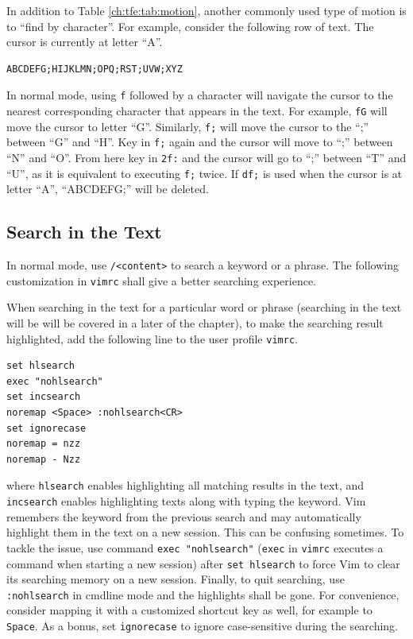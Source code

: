 In addition to Table \ref{ch:tfe:tab:motion}, another commonly used type of motion is to ``find by character''. For example, consider the following row of text. The cursor is currently at letter ``A''.
\begin{lstlisting}
ABCDEFG;HIJKLMN;OPQ;RST;UVW;XYZ
\end{lstlisting}
In normal mode, using \verb|f| followed by a character will navigate the cursor to the nearest corresponding character that appears in the text. For example, \verb|fG| will move the cursor to letter ``G''. Similarly, \verb|f;| will move the cursor to the ``;'' between ``G'' and ``H''. Key in \verb|f;| again and the cursor will move to ``;'' between ``N'' and ``O''. From here key in \verb|2f:| and the cursor will go to ``;'' between ``T'' and ``U'', as it is equivalent to executing \verb|f;| twice. If \verb|df;| is used when the cursor is at letter ``A'', ``ABCDEFG;'' will be deleted.

\subsection{Search in the Text}

In normal mode, use \verb|/<content>| to search a keyword or a phrase. The following customization in \verb|vimrc| shall give a better searching experience.

When searching in the text for a particular word or phrase (searching in the text will be will be covered in a later of the chapter), to make the searching result highlighted, add the following line to the user profile \verb|vimrc|.
\begin{lstlisting}
set hlsearch
exec "nohlsearch"
set incsearch
noremap <Space> :nohlsearch<CR>
set ignorecase
noremap = nzz
noremap - Nzz
\end{lstlisting}
where \verb|hlsearch| enables highlighting all matching results in the text, and \verb|incsearch| enables highlighting texts along with typing the keyword. Vim remembers the keyword from the previous search and may automatically highlight them in the text on a new session. This can be confusing sometimes. To tackle the issue, use command \verb|exec "nohlsearch"| (\verb|exec| in \verb|vimrc| executes a command when starting a new session) after \verb|set hlsearch| to force Vim to clear its searching memory on a new session. Finally, to quit searching, use \verb|:nohlsearch| in cmdline mode and the highlights shall be gone. For convenience, consider mapping it with a customized shortcut key as well, for example to \verb|Space|. As a bonus, set \verb|ignorecase| to ignore case-sensitive during the searching.

